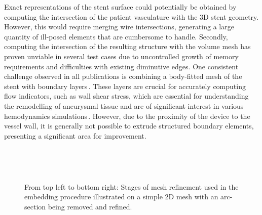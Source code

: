Exact representations of the stent surface could potentially be obtained by computing the intersection of the patient vasculature with the 3D stent geometry. However, this would require merging wire intersections, generating a large quantity of ill-posed elements that are cumbersome to handle. Secondly, computing the intersection of the resulting structure with the volume mesh has proven unviable in several test cases due to uncontrolled growth of memory requirements and difficulties with existing diminutive edges. One consistent challenge observed in all publications is combining a body-fitted mesh of the stent with boundary layers\,\cite{Larrabide2012, Larrabide2016}. These layers are crucial for accurately computing flow indicators, such as wall shear stress, which are essential for understanding the remodelling of aneurysmal tissue and are of significant interest in various hemodynamics simulations\,\cite{Meng2014}. However, due to the proximity of the device to the vessel wall, it is generally not possible to extrude structured boundary elements, presenting a significant area for improvement.
\begin{figure}[htb]
	\centering
	\begin{minipage}[t]{0.62\textwidth}
		\vspace*{0.75cm}
		\mbox{}\\[-\baselineskip]
		
	\end{minipage}
	\hfill
	\begin{minipage}[t]{0.35\textwidth}
		\mbox{}\\[-\baselineskip]
		\caption[Meshing of embedded device]{From top left to bottom right: Stages of mesh refinement used in the embedding procedure illustrated on a simple 2D mesh with an arc-section being removed and refined.}\label{fig:meshing_overview}
	\end{minipage}
\end{figure}

